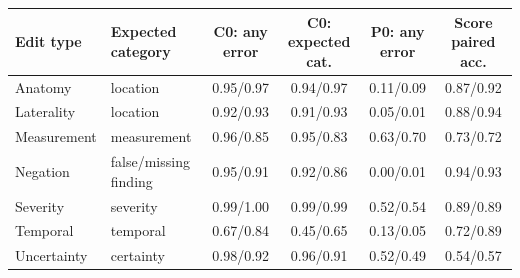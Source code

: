\begin{tabular}{llcccc}
\toprule
\textbf{Edit type} & \textbf{Expected category} & C0: any error & C0: expected cat. & P0: any error & Score paired acc. \\
\midrule
Anatomy & location & 0.95/0.97 & 0.94/0.97 & 0.11/0.09 & 0.87/0.92 \\
Laterality & location & 0.92/0.93 & 0.91/0.93 & 0.05/0.01 & 0.88/0.94 \\
Measurement & measurement & 0.96/0.85 & 0.95/0.83 & 0.63/0.70 & 0.73/0.72 \\
Negation & false/missing finding & 0.95/0.91 & 0.92/0.86 & 0.00/0.01 & 0.94/0.93 \\
Severity & severity & 0.99/1.00 & 0.99/0.99 & 0.52/0.54 & 0.89/0.89 \\
Temporal & temporal & 0.67/0.84 & 0.45/0.65 & 0.13/0.05 & 0.72/0.89 \\
Uncertainty & certainty & 0.98/0.92 & 0.96/0.91 & 0.52/0.49 & 0.54/0.57 \\
\bottomrule
\end{tabular}